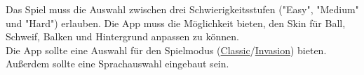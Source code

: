 Das Spiel \gls{muss} die Auswahl zwischen drei Schwierigkeitsstufen ("Easy", "Medium" und "Hard") erlauben.
Die App \gls{muss} die Möglichkeit bieten, den Skin für Ball, Schweif, Balken und Hintergrund anpassen zu können.\\
Die App \gls{sollte} eine Auswahl für den Spielmodus (\hyperref[fig:dia:classic]{Classic}/\hyperref[fig:dia:invasion]{Invasion}) bieten.
Außerdem \gls{sollte} eine Sprachauswahl eingebaut sein.
